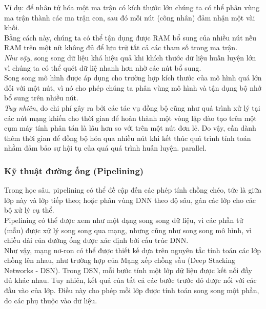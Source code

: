 \documentclass[11pt,a4paper]{article}
\numberwithin{equation}{subsection}
\numberwithin{figure}{subsection}
\numberwithin{table}{subsection}
\begin{document}
	Ví dụ: để nhân tử hóa một ma trận có kích thước lớn chúng ta có thể phân vùng ma trận thành các ma trận con, sau đó mỗi nút (công nhân) đảm nhận một vài khối.\\
	
	Bằng cách này, chúng ta có thể tận dụng được RAM bổ sung của nhiều nút nếu RAM trên một nít không đủ để lưu trữ tất cả các tham số trong ma trận.\\


\textit{Như vậy}, song song dữ liệu khá hiệu quả khi khích thước dữ liệu huấn luyện lớn vì chúng ta có thể quét dữ liệ nhanh hơn nhờ các nút bổ sung.\\

Song song mô hình được áp dụng  cho trường hợp kích thước của mô hình quá lớn đối với một nút, vì nó cho phép chúng ta phân vùng mô hình và tận dụng bộ nhớ bổ sung trên nhiều nút.\\

\textit{Tuy nhiên}, do chi phí gây ra bởi các tác vụ đồng bộ cũng như quá trình xử lý tại các nút mạng khiến cho thời gian để hoàn thành một vòng lặp đào tạo trên một cụm máy tính phân tán là lâu hơn so với trên một nút đơn lẻ. Do vậy, cần dành thêm thời gian để đồng bộ hóa qua nhiều nút khi kết thúc quá trình tính toán nhằm đảm bảo sự hội tụ của quá quá trình huấn luyện. parallel.

\subsubsection{Kỹ thuật đường ống (Pipelining)}
Trong học sâu, pipelining có thể đề cập đến các phép tính chồng chéo, tức là giữa lớp này và lớp tiếp theo; hoặc phân vùng DNN theo độ sâu, gán các lớp cho các bộ xử lý cụ thể.\\

Pipelining có thể được xem như một dạng song song dữ liệu, vì các phần tử (mẫu) được xử lý song song qua mạng, nhưng cũng như song song mô hình, vì chiều dài của đường ống được xác định bởi cấu trúc DNN.\\

Như vậy, mạng nơ-ron có thể được thiết kế dựa trên nguyên tắc tính toán các lớp chồng lên nhau, như trường hợp của Mạng xếp chồng sầu (Deep Stacking Networks - DSN). Trong DSN, mỗi bước tính một lớp dữ liệu được kết nối đầy đủ khác nhau. Tuy nhiên, kết quả của tất cả các bước trước đó được nối với các đầu vào của lớp.  Điều này cho phép mỗi lớp được tính toán song song một phần, do các phụ thuộc vào dữ liệu.
\end{document}
